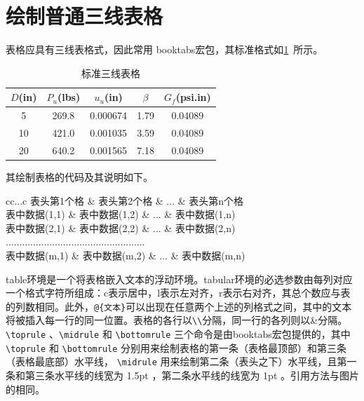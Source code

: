 \section{绘制普通三线表格}
表格应具有三线表格式，因此常用 booktabs宏包，其标准格式如\cref{tab:001}~所示。
\begin{table}[!htbp]
    \centering
    \caption{标准三线表格}\label{tab:001}
    \begin{tabular}{ccccc}
        \toprule[1.5pt]
        $D$(in) & $P_u$(lbs) & $u_u$(in) & $\beta$ & $G_f$(psi.in)\\
        \midrule[1pt]
        5 & 269.8 & 0.000674 & 1.79 & 0.04089\\
        10 & 421.0 & 0.001035 & 3.59 & 0.04089\\
        20 & 640.2 & 0.001565 & 7.18 & 0.04089\\
        \bottomrule[1.5pt]
    \end{tabular}
\end{table}

其绘制表格的代码及其说明如下。
\begin{tcode}
    \begin{table}[!htbp]
        \centering
        \caption[标签名]{中文标题}
        \begin{tabular}{cc...c}
            \toprule[1.5pt]
            表头第1个格   & 表头第2个格   & ... & 表头第n个格  \\
            \midrule[1pt]
            表中数据(1,1) & 表中数据(1,2) & ... & 表中数据(1,n)\\
            表中数据(2,1) & 表中数据(2,2) & ... & 表中数据(2,n)\\
            ...................................................\\
            表中数据(m,1) & 表中数据(m,2) & ... & 表中数据(m,n)\\
            \bottomrule[1.5pt]
        \end{tabular}
    \end{table}
\end{tcode}

\bigskip

table环境是一个将表格嵌入文本的浮动环境。tabular环境的必选参数由每列对应一个格式字符所组成：c表示居中，l表示左对齐，r表示右对齐，其总个数应与表的列数相同。此外，\verb|@{文本}|可以出现在任意两个上述的列格式之间，其中的文本将被插入每一行的同一位置。表格的各行以\verb|\\|分隔，同一行的各列则以\&分隔。 \verb|\toprule| 、\verb|\midrule| 和 \verb|\bottomrule| 三个命令是由booktabs宏包提供的，其中 \verb|\toprule| 和 \verb|\bottomrule| 分别用来绘制表格的第一条（表格最顶部）和第三条（表格最底部）水平线， \verb|\midrule| 用来绘制第二条（表头之下）水平线，且第一条和第三条水平线的线宽为 1.5pt ，第二条水平线的线宽为 1pt 。引用方法与图片的相同。
